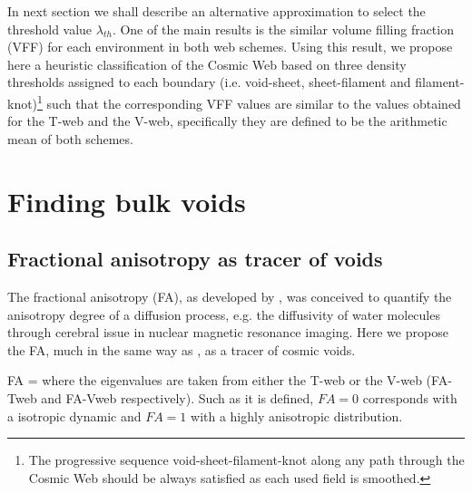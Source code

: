 \documentclass[a4,useAMS,usenatbib,usegraphicx]{latex/mn2e}
\begin{document}
In next section we shall describe an alternative approximation to select 
the threshold value $\lambda_{th}$. One of the main results is the similar 
volume filling fraction (VFF) for each environment in both web schemes. 
Using this result, we propose here a heuristic classification of the 
Cosmic Web based on three density thresholds assigned to each boundary 
(i.e. void-sheet, sheet-filament and filament-knot)\footnote{The 
progressive sequence void-sheet-filament-knot along any path through the 
Cosmic Web should be always satisfied as each used field is smoothed.} 
such that the corresponding VFF values are similar to the values obtained 
for the T-web and the V-web, specifically they are defined to be the 
arithmetic mean of both schemes.


\section{Finding bulk voids}
\label{sec:bulk_voids}


\subsection{Fractional anisotropy as tracer of voids}
\label{subsec:FA_voids}


The fractional anisotropy (FA), as developed by \citet{Basser95}, was 
conceived to quantify the anisotropy degree of a diffusion process, e.g. 
the diffusivity of water molecules through cerebral issue in nuclear
magnetic resonance imaging. Here we propose the FA, much in the same 
way as \citet{Libeskind13}, as a tracer of cosmic voids.


{ FA =  }
where the eigenvalues are taken from either the T-web or the V-web 
(FA-Tweb and FA-Vweb respectively). Such as it is defined, $FA=0$ 
corresponds with a isotropic dynamic and $FA=1$ with a highly anisotropic 
distribution.
\end{document}
